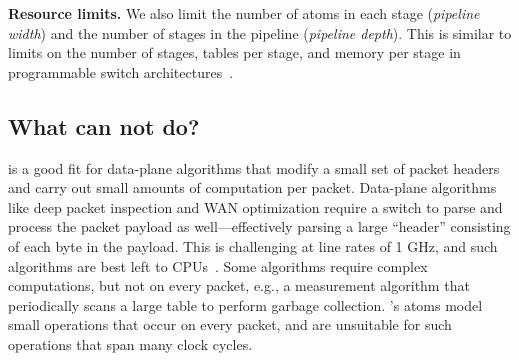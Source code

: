 \medskip
\noindent
\textbf{Resource limits.} We also limit the number of atoms in each stage
(\textit{pipeline width}) and the number of stages in the pipeline
(\textit{pipeline depth}). This is similar to limits on the number of stages,
tables per stage, and memory per stage in programmable switch
architectures~\cite{lavanya_compiler}.

\subsection{What can \absmachine not do?}
\label{ss:limitations}

\absmachine is a good fit for data-plane algorithms that modify a small set of
packet headers and carry out small amounts of computation per packet.
Data-plane algorithms like deep packet inspection and WAN optimization require
a switch to parse and process the packet payload as well---effectively parsing
a large ``header'' consisting of each byte in the payload. This is challenging
at line rates of 1 GHz, and such algorithms are best left to CPUs~\cite{e2}.
Some algorithms require complex computations, but not on every packet, e.g., a
measurement algorithm that periodically scans a large table to perform garbage
collection.  \absmachine's atoms model small operations that occur on every
packet, and are unsuitable for such operations that span many clock cycles.
